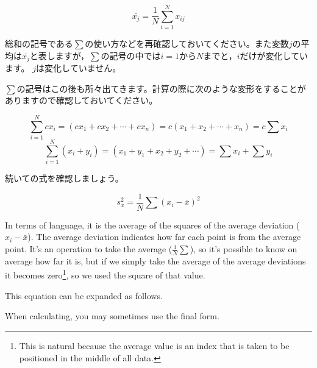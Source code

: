 \documentclass{ltjsbook}
\begin{document}
\[  \bar{x_j} = \frac{1}{N} \sum_{i=1}^N x_{ij} \]

総和の記号である$\sum$の使い方などを再確認しておいてください。また変数$j$の平均は$\bar{x_j}$と表しますが，$\sum$の記号の中では$i=1$から$N$までと，$i$だけが変化しています。 $j$は変化していません。

$\sum$の記号はこの後も所々出てきます。計算の際に次のような変形をすることがありますので確認しておいてください。

\[ \sum_{i=1}^N cx_i = (cx_1 + cx_2 + \cdots + cx_n) = c(x_1 + x_2 + \cdots + x_n) =  c\sum x_i \]
\[ \sum_{i=1}^N (x_i + y_i) = (x_1 + y_1 + x_2 + y_2 + \cdots) = \sum x_i + \sum y_i \]

続いての式を確認しましょう。

\[ s_x^2 = \frac{1}{N}\sum(x_i - \bar{x})^2 \]

In terms of language, it is the average of the squares of the average deviation ($x_i - \bar{x}$). The average deviation indicates how far each point is from the average point. It's an operation to take the average ($\frac{1}{N}\sum$), so it's possible to know on average how far it is, but if we simply take the average of the average deviations it becomes zero\footnote{This is natural because the average value is an index that is taken to be positioned in the middle of all data.}, so we used the square of that value.

This equation can be expanded as follows.



When calculating, you may sometimes use the final form.
\end{document}
